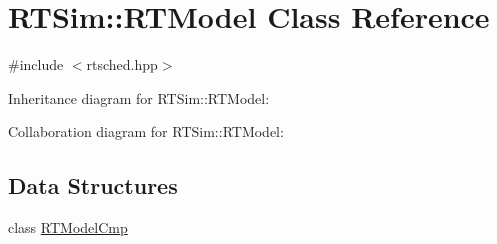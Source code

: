 \hypertarget{classRTSim_1_1RTModel}{}\section{R\+T\+Sim\+:\+:R\+T\+Model Class Reference}
\label{classRTSim_1_1RTModel}


{\ttfamily \#include $<$rtsched.\+hpp$>$}



Inheritance diagram for R\+T\+Sim\+:\+:R\+T\+Model\+:


Collaboration diagram for R\+T\+Sim\+:\+:R\+T\+Model\+:
\subsection*{Data Structures}
\begin{DoxyCompactItemize}
\item 
class \hyperlink{classRTSim_1_1RTModel_1_1RTModelCmp}{R\+T\+Model\+Cmp}
\end{DoxyCompactItemize}
